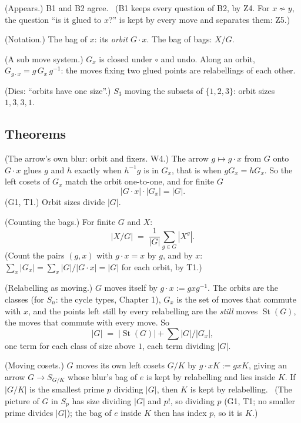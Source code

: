 \begin{lines}
\item[\lab{P1}] (Appears.) B1 and B2 agree. \ (B1 keeps every question of B2, by Z4. For $x \not\sim y$, the question ``is it glued to $x$?'' is kept by every move and separates them: Z5.)
\item[\lab{N1}] (Notation.) The bag of $x$: its \emph{orbit} $G \cdot x$. The bag of bags: $X / G$.
\item[\lab{P2}] (A sub move system.) $G_x$ is closed under $\circ$ and undo. Along an orbit, $G_{g \cdot x} = g\, G_x\, g^{-1}$: the moves fixing two glued points are relabellings of each other.
\item[\lab{P3}] (Dies: ``orbits have one size''.) $S_3$ moving the subsets of $\{1, 2, 3\}$: orbit sizes $1, 3, 3, 1$.
\end{lines}

\subsection*{Theorems}

\begin{lines}
\item[\lab{T1}] (The arrow's own blur: orbit and fixers. W4.) The arrow $g \mapsto g \cdot x$ from $G$ onto $G \cdot x$ glues $g$ and $h$ exactly when $h^{-1} g$ is in $G_x$, that is when $g G_x = h G_x$. So the left cosets of $G_x$ match the orbit one-to-one, and for finite $G$ \[ |G \cdot x| \cdot |G_x| = |G| . \] (G1, T1.) Orbit sizes divide $|G|$.
\item[\lab{T2}] (Counting the bags.) For finite $G$ and $X$: \[ |X / G| \;=\; \frac{1}{|G|} \sum_{g \in G} |X^g| . \] (Count the pairs $(g, x)$ with $g \cdot x = x$ by $g$, and by $x$: $\sum_x |G_x| = \sum_x |G| / |G \cdot x| = |G|$ for each orbit, by T1.)
\item[\lab{T3}] (Relabelling as moving.) $G$ moves itself by $g \cdot x := g x g^{-1}$. The orbits are the classes (for $S_n$: the cycle types, Chapter 1), $G_x$ is the set of moves that commute with $x$, and the points left still by every relabelling are the \emph{still} moves $\operatorname{St}(G)$, the moves that commute with every move. So \[ |G| \;=\; |\operatorname{St}(G)| + \sum |G| / |G_x| , \] one term for each class of size above $1$, each term dividing $|G|$.
\item[\lab{T4}] (Moving cosets.) $G$ moves its own left cosets $G/K$ by $g \cdot xK := gxK$, giving an arrow $G \to S_{G/K}$ whose blur's bag of $e$ is kept by relabelling and lies inside $K$. If $|G / K|$ is the smallest prime $p$ dividing $|G|$, then $K$ is kept by relabelling. \ (The picture of $G$ in $S_p$ has size dividing $|G|$ and $p!$, so dividing $p$ (G1, T1; no smaller prime divides $|G|$); the bag of $e$ inside $K$ then has index $p$, so it is $K$.)
\end{lines}

